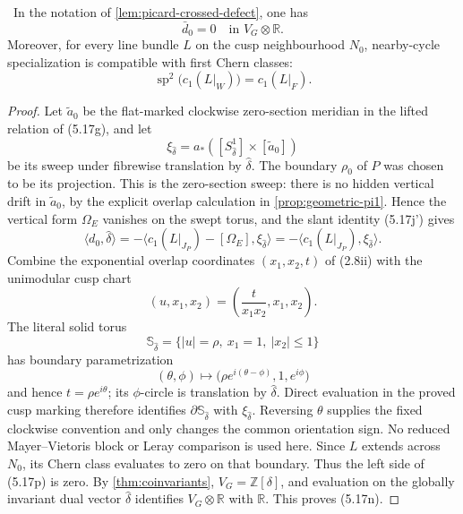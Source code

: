 \begin{lemma}
\label{lem:picard-cusp-defect}
\Verified\ In the notation of
\cref{lem:picard-crossed-defect}, one has
\[
 \bar d_0=0\quad\text{in }V_G\otimes\mathbb R.
\tag{5.17n}
\]
Moreover, for every line bundle $L$ on the cusp neighbourhood $N_0$,
nearby-cycle specialization is compatible with first Chern classes:
\[
 \operatorname{sp}^2\bigl(c_1(L|_W)\bigr)=c_1(L|_F).
\tag{5.17o}
\]
\end{lemma}

\begin{proof}
Let $\widetilde a_0$ be the flat-marked clockwise zero-section meridian in
the lifted relation of (5.17g), and let
\[
 \xi_{\widehat\delta}
 =a_*([S^1_{\widehat\delta}]\times[\widetilde a_0])
\]
be its sweep under fibrewise translation by $\widehat\delta$.  The boundary
$\rho_0$ of $P$ was chosen to be its projection.  This is the zero-section
sweep: there is no hidden vertical drift in $\widetilde a_0$, by the
explicit overlap calculation in \cref{prop:geometric-pi1}.  Hence the
vertical form $\Omega_E$ vanishes on the swept torus, and the slant identity
(5.17j') gives
\[
 \langle d_0,\widehat\delta\rangle
 =-\langle c_1(L|_{J_P})-[\Omega_E],
          \xi_{\widehat\delta}\rangle
 =-\langle c_1(L|_{J_P}),\xi_{\widehat\delta}\rangle.
\tag{5.17p}
\]
Combine the exponential overlap coordinates $(x_1,x_2,t)$ of (2.8ii) with
the unimodular cusp chart
\[
 (u,x_1,x_2)=\left(\frac{t}{x_1x_2},x_1,x_2\right).
\]
The literal solid torus
\[
 \mathbb S_{\widehat\delta}
 =\{|u|=\rho,\ x_1=1,\ |x_2|\le1\}
\]
has boundary parametrization
\[
 (\theta,\phi)\longmapsto
 \bigl(\rho e^{i(\theta-\phi)},1,e^{i\phi}\bigr)
\tag{5.17p0}
\]
and hence $t=\rho e^{i\theta}$; its $\phi$-circle is translation by
$\widehat\delta$.  Direct evaluation in the proved cusp marking therefore
identifies $\partial\mathbb S_{\widehat\delta}$ with
$\xi_{\widehat\delta}$.  Reversing $\theta$ supplies the fixed clockwise
convention and only changes the common orientation sign.  No reduced
Mayer--Vietoris block or Leray comparison is used here.
Since $L$ extends across $N_0$, its Chern class evaluates to zero on that
boundary.  Thus the left side of (5.17p) is zero.  By
\cref{thm:coinvariants}, $V_G=\mathbb Z[\delta]$, and evaluation on the
globally invariant dual vector $\widehat\delta$ identifies
$V_G\otimes\mathbb R$ with $\mathbb R$.  This proves (5.17n).


\end{proof}
